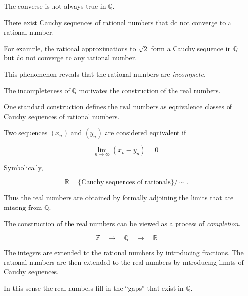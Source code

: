 
\begin{remark}
\label{rem:cauchy-not-convergent}

The converse is not always true in $\mathbb{Q}$.

There exist Cauchy sequences of rational numbers that do not converge
to a rational number.

For example, the rational approximations to $\sqrt{2}$ form a Cauchy
sequence in $\mathbb{Q}$ but do not converge to any rational number.

This phenomenon reveals that the rational numbers are
\emph{incomplete}.

\end{remark}


\begin{remark}
\label{rem:real-motivation}

The incompleteness of $\mathbb{Q}$ motivates the construction of the
real numbers.

One standard construction defines the real numbers as equivalence
classes of Cauchy sequences of rational numbers.

Two sequences $(x_n)$ and $(y_n)$ are considered equivalent if

\[
\lim_{n\to\infty}(x_n - y_n) = 0.
\]

Symbolically,

\[
\mathbb{R}
=
\{\text{Cauchy sequences of rationals}\}/\sim .
\]

Thus the real numbers are obtained by formally adjoining the limits
that are missing from $\mathbb{Q}$.

\end{remark}


\begin{remark}
\label{rem:completion-big-picture}

The construction of the real numbers can be viewed as a process of
\emph{completion}.

\[
\mathbb{Z}
\quad \longrightarrow \quad
\mathbb{Q}
\quad \longrightarrow \quad
\mathbb{R}
\]

The integers are extended to the rational numbers by introducing
fractions.  The rational numbers are then extended to the real numbers
by introducing limits of Cauchy sequences.

In this sense the real numbers fill in the ``gaps'' that exist in
$\mathbb{Q}$.

\end{remark}